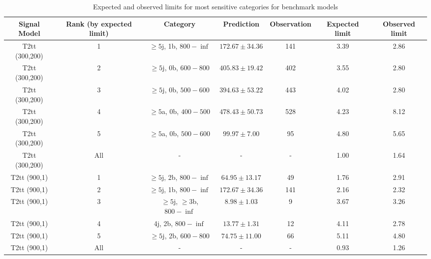 \begin{landscape}
\begin{longtable}{ccccccc}
\caption{Expected and observed limits for most sensitive categories for benchmark models} \label{tab:benchMarkTable_T2tt} \\    \hline
Signal Model & Rank (by expected limit) & Category & Prediction & Observation & Expected limit & Observed limit\\ \hline
T2tt (300,200) & 1 & $\ge5$j, 1b, $800-\inf$ & $172.67 \pm 34.36$ & 141 & 3.39 & 2.86\\ 
T2tt (300,200) & 2 & $\ge5$j, 0b, $600-800$ & $405.83 \pm 19.42$ & 402 & 3.55 & 2.80\\ 
T2tt (300,200) & 3 & $\ge5$j, 0b, $500-600$ & $394.63 \pm 53.22$ & 443 & 4.02 & 2.80\\ 
T2tt (300,200) & 4 & $\ge5$a, 0b, $400-500$ & $478.43 \pm 50.73$ & 528 & 4.23 & 8.12\\ 
T2tt (300,200) & 5 & $\ge5$a, 0b, $500-600$ & $99.97 \pm 7.00$ & 95 & 4.80 & 5.65\\ 
T2tt (300,200) & All & - & - & - & 1.00 & 1.64\\ 
T2tt (900,1) & 1 & $\ge5$j, 2b, $800-\inf$ & $64.95 \pm 13.17$ & 49 & 1.76 & 2.91\\ 
T2tt (900,1) & 2 & $\ge5$j, 1b, $800-\inf$ & $172.67 \pm 34.36$ & 141 & 2.16 & 2.32\\ 
T2tt (900,1) & 3 & $\ge5$j, $\ge3$b, $800-\inf$ & $8.98 \pm 1.03$ & 9 & 3.67 & 3.26\\ 
T2tt (900,1) & 4 & 4j, 2b, $800-\inf$ & $13.77 \pm 1.31$ & 12 & 4.11 & 2.78\\ 
T2tt (900,1) & 5 & $\ge5$j, 2b, $600-800$ & $74.75 \pm 11.00$ & 66 & 5.11 & 4.80\\ 
T2tt (900,1) & All & - & - & - & 0.93 & 1.26\\ 
\hline
\hline
\end{longtable}
\end{landscape}
